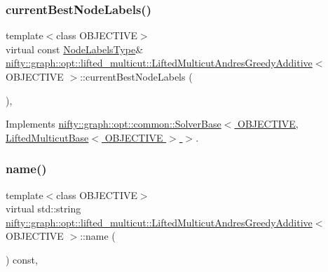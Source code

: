 \subsubsection{\texorpdfstring{current\+Best\+Node\+Labels()}{currentBestNodeLabels()}}
{\footnotesize\ttfamily template$<$class O\+B\+J\+E\+C\+T\+I\+VE$>$ \\
virtual const \hyperlink{classnifty_1_1graph_1_1opt_1_1lifted__multicut_1_1LiftedMulticutAndresGreedyAdditive_ae5dcc77ffcf6364667033052f43327e8}{Node\+Labels\+Type}\& \hyperlink{classnifty_1_1graph_1_1opt_1_1lifted__multicut_1_1LiftedMulticutAndresGreedyAdditive}{nifty\+::graph\+::opt\+::lifted\+\_\+multicut\+::\+Lifted\+Multicut\+Andres\+Greedy\+Additive}$<$ O\+B\+J\+E\+C\+T\+I\+VE $>$\+::current\+Best\+Node\+Labels (\begin{DoxyParamCaption}{ }\end{DoxyParamCaption})\hspace{0.3cm}{\ttfamily [inline]}, {\ttfamily [virtual]}}



Implements \hyperlink{classnifty_1_1graph_1_1opt_1_1common_1_1SolverBase_a7bbe01ee201cf3157b251e54c5ff0619}{nifty\+::graph\+::opt\+::common\+::\+Solver\+Base$<$ O\+B\+J\+E\+C\+T\+I\+V\+E, Lifted\+Multicut\+Base$<$ O\+B\+J\+E\+C\+T\+I\+V\+E $>$ $>$}.

\mbox{\label{classnifty_1_1graph_1_1opt_1_1lifted__multicut_1_1LiftedMulticutAndresGreedyAdditive_a4ab9f84d8b762a10f8f31f5dc5721e70}} 
\subsubsection{\texorpdfstring{name()}{name()}}
{\footnotesize\ttfamily template$<$class O\+B\+J\+E\+C\+T\+I\+VE$>$ \\
virtual std\+::string \hyperlink{classnifty_1_1graph_1_1opt_1_1lifted__multicut_1_1LiftedMulticutAndresGreedyAdditive}{nifty\+::graph\+::opt\+::lifted\+\_\+multicut\+::\+Lifted\+Multicut\+Andres\+Greedy\+Additive}$<$ O\+B\+J\+E\+C\+T\+I\+VE $>$\+::name (\begin{DoxyParamCaption}{ }\end{DoxyParamCaption}) const\hspace{0.3cm}{\ttfamily [inline]}, {\ttfamily [virtual]}}



